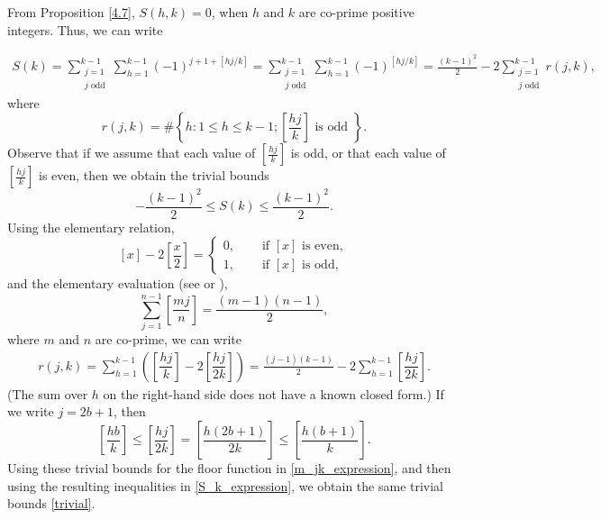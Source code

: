 \documentclass[11pt,reqno]{amsart}
\newcommand{\df}{\dfrac}
\theoremstyle{plain}
\numberwithin{equation}{section}
\begin{document}
From Proposition \ref{4.7}, $S(h,k)=0$, when $h$ and $k$ are co-prime positive integers.  Thus, we can write

\begin{align}
	S(k)=\sum_{\substack{j=1\\j\text{ odd}}}^{k-1}\sum_{h=1}^{k-1} (-1)^{j+1+[hj/k]}
	=\sum_{\substack{j=1\\j\text{ odd}}}^{k-1}\sum_{h=1}^{k-1} (-1)^{[hj/k]}
	=\frac{(k-1)^2}{2}-2\sum_{\substack{j=1\\j\text{ odd}}}^{k-1}r(j,k), \label{S_k_expression}
\end{align}
where
\begin{equation}\label{r}
r(j,k)= \#\left\{h: 1\leq h\leq k-1;  \left[\df{hj}{k}\right] \text{ is odd }\right\}.
\end{equation}
Observe that if we assume that each value of $\left[\frac{hj}{k}\right]$ is odd, or that each value  of $\left[\frac{hj}{k}\right]$ is even, then we obtain the trivial bounds
\begin{equation}\label{trivial}
-\df{(k-1)^2}{2}\leq S(k) \leq \df{(k-1)^2}{2}.
\end{equation}
Using the elementary relation,
\begin{equation}
    \label{squarebrackets}
[x]-2\left[\dfrac{x}{2}\right] = \begin{cases} 0, \quad &\text{ if $[x]$ is even},\\
1, &\text{ if $[x]$ is odd},
\end{cases}
\end{equation}
and the elementary evaluation (see \cite[p.~32, Equation (41)]{rg} or \cite[p.~214, Equation (4.6)]{berndt-dieter}),
 \begin{equation}\label{elementary evaluation}
\sum_{j=1}^{n-1} \left[\frac{mj}{n}\right] = \frac{(m-1)(n-1)}{2},
\end{equation}
where $m$ and $n$ are co-prime,
we can write
\begin{align}
    r(j,k)= \sum_{h=1}^{k-1} \left(\left[\df{hj}{k}\right]-2\left[\df{hj}{2k}\right]\right)
    =\frac{(j-1)(k-1)}{2}-2\sum_{h=1}^{k-1}\left[\df{hj}{2k}\right].\label{m_jk_expression}
  \end{align}
  (The sum over $h$  on the right-hand side  does  not have a known closed form.)
If we write $j=2b+1$, then
$$\left[\frac{hb}{k}\right]\leq \left[\frac{hj}{2k}\right]=\left[\frac{h(2b+1)}{2k}\right]\leq \left[\frac{h(b+1)}{k}\right].$$
Using these trivial bounds for the floor function in \eqref{m_jk_expression}, and then using the resulting inequalities in \eqref{S_k_expression}, we obtain the same trivial bounds  \eqref{trivial}.
\end{document}
